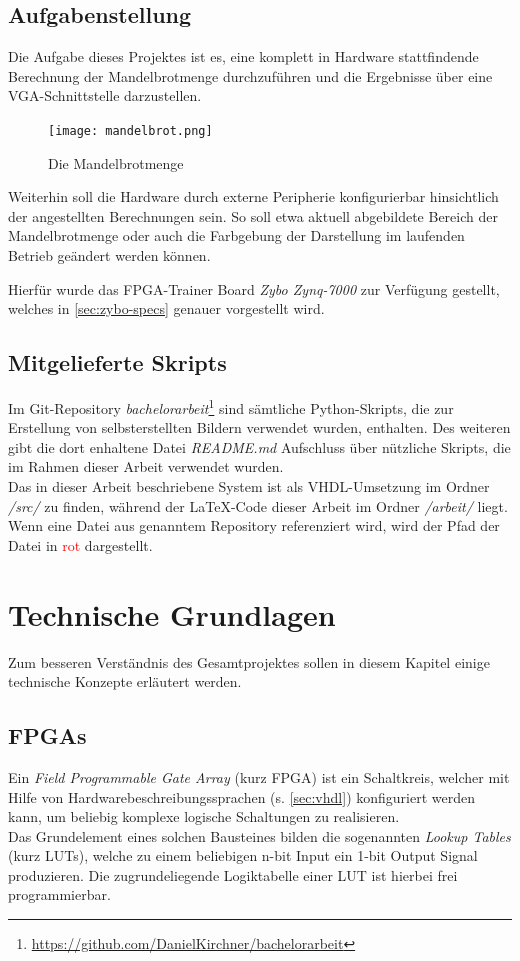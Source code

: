 \documentclass[a4paper,12pt,onesided]{report}
\begin{document}
\section{Aufgabenstellung}
\label{sec:aufgabenstellung}
Die Aufgabe dieses Projektes ist es, eine komplett in Hardware stattfindende Berechnung der Mandelbrotmenge durchzuführen und die Ergebnisse über eine VGA-Schnittstelle darzustellen.

\begin{figure}[H]
	\centering
	\texttt{[image: mandelbrot.png]}
	\caption{Die Mandelbrotmenge}
	\label{fig:mandelbrotmenge}
\end{figure}

Weiterhin soll die Hardware durch externe Peripherie konfigurierbar hinsichtlich der angestellten Berechnungen sein.
So soll etwa aktuell abgebildete Bereich der Mandelbrotmenge oder auch die Farbgebung der Darstellung im laufenden Betrieb geändert werden können.

Hierfür wurde das FPGA-Trainer Board \textit{Zybo Zynq-7000} zur Verfügung gestellt, welches in \autoref{sec:zybo-specs} genauer vorgestellt wird.

\section{Mitgelieferte Skripts}
Im Git-Repository \textit{bachelorarbeit}\footnote{\url{https://github.com/DanielKirchner/bachelorarbeit}} sind sämtliche Python-Skripts, die zur Erstellung von selbsterstellten Bildern verwendet wurden, enthalten. Des weiteren gibt die dort enhaltene Datei \textit{README.md} Aufschluss über nützliche Skripts, die im Rahmen dieser Arbeit verwendet wurden.\\
Das in dieser Arbeit beschriebene System ist als VHDL-Umsetzung im Ordner \textit{/src/} zu finden, während der \LaTeX-Code dieser Arbeit im Ordner \textit{/arbeit/} liegt.
Wenn eine Datei aus genanntem Repository referenziert wird, wird der Pfad der Datei in \textcolor{red}{rot} dargestellt.

\chapter{Technische Grundlagen}
Zum besseren Verständnis des Gesamtprojektes sollen in diesem Kapitel einige technische Konzepte erläutert werden.

\section{FPGAs}
\label{sec:fpga}
Ein \textit{Field Programmable Gate Array} (kurz FPGA) ist ein Schaltkreis, welcher mit Hilfe von Hardwarebeschreibungssprachen (s. \autoref{sec:vhdl})
konfiguriert werden kann, um beliebig komplexe logische Schaltungen zu realisieren.\\
Das Grundelement eines solchen Bausteines bilden die sogenannten \textit{Lookup Tables} (kurz LUTs), welche zu einem beliebigen n-bit Input ein 1-bit Output Signal produzieren. Die zugrundeliegende Logiktabelle einer LUT ist hierbei frei programmierbar.
\end{document}
